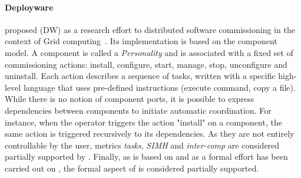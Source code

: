 \paragraph{Deployware}
\citeauthor{flissi2008ccgrid} proposed \deployware (DW) as a research effort to distributed software commissioning in the context of Grid computing~\cite{flissi2008ccgrid}. Its implementation is based on the \fractal component model. A component is called a \emph{Personality} and is associated with a fixed set of commissioning actions: install, configure, start, manage, stop, unconfigure and uninstall. Each action describes a sequence of tasks, written with a specific high-level language that uses pre-defined instructions (\eg execute command, copy a file). While there is no notion of component ports, it is possible
to express dependencies between components to initiate automatic coordination. For instance, when the operator triggers the action "install" on a component, the same action is triggered recursively to its dependencies. As they are not entirely controllable by the user, metrics \emph{tasks}, \emph{SIMH} and \emph{inter-comp} are considered partially supported by \deployware. Finally, as \deployware is
based on \fractal and as a formal effort has been carried out on \fractal, the formal aspect of \deployware is considered partially supported.

